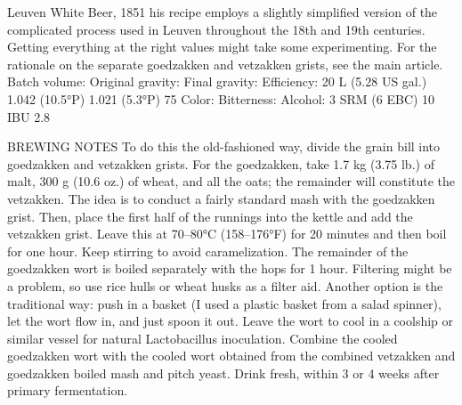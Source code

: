 \documentclass[a4paper,parskip=half]{scrartcl}
\begin{document}
Leuven White Beer,
1851
his recipe employs a slightly simplified version of the complicated process used in Leuven throughout the
18th and 19th centuries. Getting everything at the right values might take some experimenting. For the
rationale on the separate goedzakken and vetzakken grists, see the main article.
Batch volume:
Original gravity:
Final gravity:
Efficiency:
20 L (5.28 US gal.)
1.042 (10.5°P)
1.021 (5.3°P)
75%
Color:
Bitterness:
Alcohol:
3 SRM (6 EBC)
10 IBU
2.8%

BREWING NOTES
To do this the old-fashioned way, divide the grain bill into goedzakken and vetzakken grists. For the
goedzakken, take 1.7 kg (3.75 lb.) of malt, 300 g (10.6 oz.) of wheat, and all the oats; the remainder will
constitute the vetzakken. The idea is to conduct a fairly standard mash with the goedzakken grist. Then,
place the first half of the runnings into the kettle and add the vetzakken grist. Leave this at 70–80°C
(158–176°F) for 20 minutes and then boil for one hour. Keep stirring to avoid caramelization.
The remainder of the goedzakken wort is boiled separately with the hops for 1 hour. Filtering might be a
problem, so use rice hulls or wheat husks as a filter aid. Another option is the traditional way: push in a
basket (I used a plastic basket from a salad spinner), let the wort flow in, and just spoon it out.
Leave the wort to cool in a coolship or similar vessel for natural Lactobacillus inoculation. Combine the
cooled goedzakken wort with the cooled wort obtained from the combined vetzakken and goedzakken
boiled mash and pitch yeast. Drink fresh, within 3 or 4 weeks after primary fermentation.

\parencite[49]{Mulder2020}
\end{document}
